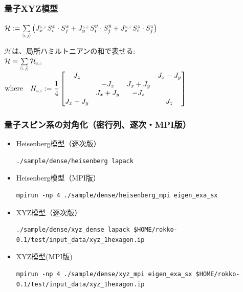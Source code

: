 \begin{frame}[c,fragile]
  \frametitle{量子XYZ模型}
\setlength{\fboxsep}{1pt}

\noindent
$\mathcal{H}
 := \sum\limits_{\middlescr{{\langle i,j \rangle}}} \left(
  J_x^{\smallscr{\langle i,j \rangle}} \, S^x_i \cdot S^x_j
+ J_y^{\smallscr{\langle i,j \rangle}} \, S^y_i \cdot S^y_j
+ J_z^{\smallscr{\langle i,j \rangle}} \, S^z_i \cdot S^z_j
\right)$

\vspace{1\baselineskip}

\noindent
$\mathcal{H}$は、局所ハミルトニアンの和で表せる:\\
\noindent
$\mathcal{H} =
\sum\limits_{\middlescr{\langle i,j \rangle}}  \mathcal{H}_{\smallscr{\langle i,j \rangle}}$ \\
$\text{where} \quad  H_{\smallscr{\langle i,j \rangle}} :=
\dfrac{1}{4}
\begin{bmatrix}
J_z & & & J_x-J_y \\
 & - J_z & J_x+J_y & \\
 & J_x+J_y & - J_z & \\
J_x-J_y & & & J_z
\end{bmatrix}$

\end{frame}

\begin{frame}[c,fragile]
  \frametitle{量子スピン系の対角化（密行列、逐次・MPI版）}
  \begin{itemize}
  \item Heisenberg模型（逐次版） 
\begin{lstlisting}[style=shstyle]
./sample/dense/heisenberg lapack
\end{lstlisting}
  \item Heisenberg模型（MPI版） 
\begin{lstlisting}[style=shstyle]
mpirun -np 4 ./sample/dense/heisenberg_mpi eigen_exa_sx
\end{lstlisting}
  \item XYZ模型（逐次版） 
\begin{lstlisting}[style=shstyle]
./sample/dense/xyz_dense lapack $HOME/rokko-0.1/test/input_data/xyz_1hexagon.ip
\end{lstlisting}
  \item XYZ模型(MPI版) 
\begin{lstlisting}[style=shstyle]
mpirun -np 4 ./sample/dense/xyz_mpi eigen_exa_sx $HOME/rokko-0.1/test/input_data/xyz_1hexagon.ip
\end{lstlisting}
  \end{itemize}
\end{frame}

